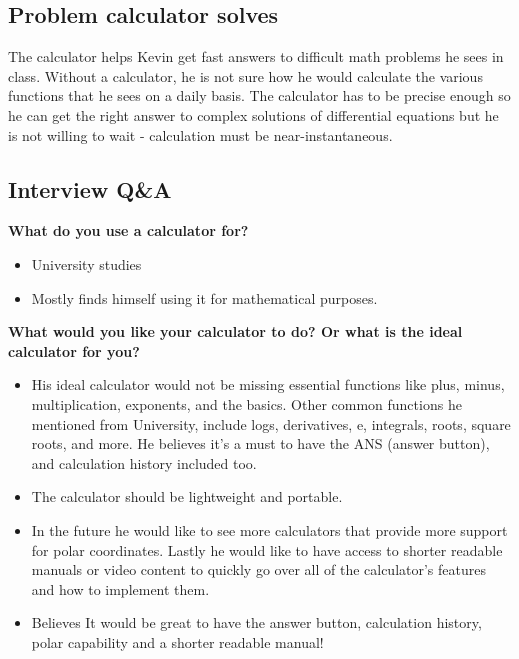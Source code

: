 \documentclass{article}
\begin{document}
\subsection*{Problem calculator solves}
The calculator helps Kevin get fast answers to difficult math problems he sees in class. Without a calculator, he is not sure how he would calculate the various functions that he sees on a daily basis. The calculator has to be precise enough so he can get the right answer to complex solutions of differential equations but he is not willing to wait - calculation must be near-instantaneous.
\pagebreak

\subsection*{Interview Q\&A}
\textbf{What do you use a calculator for?}
\begin{itemize}
\itemsep0em 
\item University studies
\item Mostly finds himself using it for mathematical purposes. 
\end{itemize}

\textbf{What would you like your calculator to do? Or what is the ideal calculator for you?}
\begin{itemize}
\itemsep0em 
\item His  ideal calculator would not be missing essential functions like plus, minus, multiplication, exponents, and the basics. Other common functions he mentioned from University, include logs, derivatives, e, integrals, roots, square roots, and more. He believes it’s a must to have the ANS (answer button), and calculation history included too. 
\item The calculator should be lightweight and portable. 
\item In the future he would like to see more calculators that provide more support for polar coordinates. Lastly he would like to have access to shorter readable manuals or video content to quickly go over all of the calculator’s features and how to implement them.
\item Believes It would be great to have the answer button, calculation history, polar capability and a shorter readable manual! 
\end{itemize}
\end{document}
